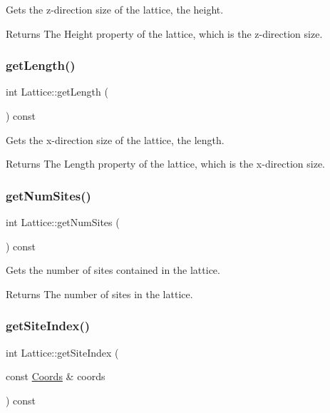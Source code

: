 Gets the z-\/direction size of the lattice, the height. 

\begin{DoxyReturn}{Returns}
The Height property of the lattice, which is the z-\/direction size. 
\end{DoxyReturn}
\mbox{\label{class_lattice_a4b43b67a36fcd3dfe62c9eeaffa561d2}} 
\subsubsection{\texorpdfstring{get\+Length()}{getLength()}}
{\footnotesize\ttfamily int Lattice\+::get\+Length (\begin{DoxyParamCaption}{ }\end{DoxyParamCaption}) const}



Gets the x-\/direction size of the lattice, the length. 

\begin{DoxyReturn}{Returns}
The Length property of the lattice, which is the x-\/direction size. 
\end{DoxyReturn}
\mbox{\label{class_lattice_ae8046ebe4dbbe34b03548384ae79d4ae}} 
\subsubsection{\texorpdfstring{get\+Num\+Sites()}{getNumSites()}}
{\footnotesize\ttfamily int Lattice\+::get\+Num\+Sites (\begin{DoxyParamCaption}{ }\end{DoxyParamCaption}) const}



Gets the number of sites contained in the lattice. 

\begin{DoxyReturn}{Returns}
The number of sites in the lattice. 
\end{DoxyReturn}
\mbox{\label{class_lattice_abafcbcee9689c0cf7a21134095075604}} 
\subsubsection{\texorpdfstring{get\+Site\+Index()}{getSiteIndex()}}
{\footnotesize\ttfamily int Lattice\+::get\+Site\+Index (\begin{DoxyParamCaption}\item[{const \hyperlink{struct_coords}{Coords} \&}]{coords }\end{DoxyParamCaption}) const}



